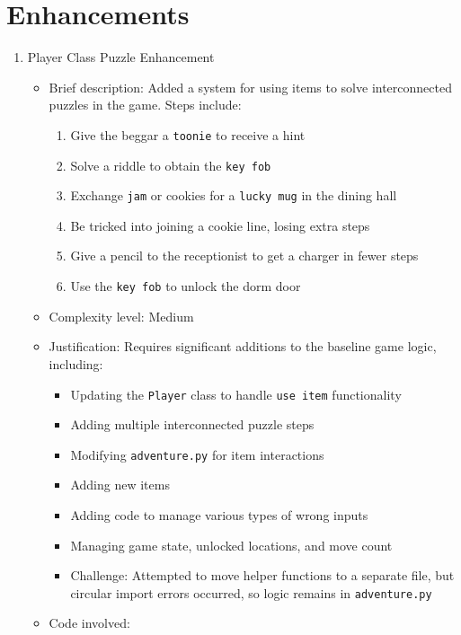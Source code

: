 \documentclass[11pt]{article}
\begin{document}
\section*{Enhancements}
\begin{enumerate}
    \item Player Class Puzzle Enhancement
    \begin{itemize}
        \item Brief description: Added a system for using items to solve interconnected puzzles in the game. Steps include:
        \begin{enumerate}
            \item Give the beggar a \texttt{toonie} to receive a hint
            \item Solve a riddle to obtain the \texttt{key fob}
            \item Exchange \texttt{jam} or cookies for a \texttt{lucky mug} in the dining hall
            \item Be tricked into joining a cookie line, losing extra steps
            \item Give a pencil to the receptionist to get a charger in fewer steps
            \item Use the \texttt{key fob} to unlock the dorm door
        \end{enumerate}
        \item Complexity level: Medium
        \item Justification: Requires significant additions to the baseline game logic, including:
        \begin{itemize}
            \item Updating the \texttt{Player} class to handle \texttt{use item} functionality
            \item Adding multiple interconnected puzzle steps
            \item Modifying \texttt{adventure.py} for item interactions
            \item Adding new items
            \item Adding code to manage various types of wrong inputs
            \item Managing game state, unlocked locations, and move count
            \item Challenge: Attempted to move helper functions to a separate file, but circular import errors occurred, so logic remains in \texttt{adventure.py}
        \end{itemize}
        \item Code involved:

\end{itemize}
\end{enumerate}
\end{document}
